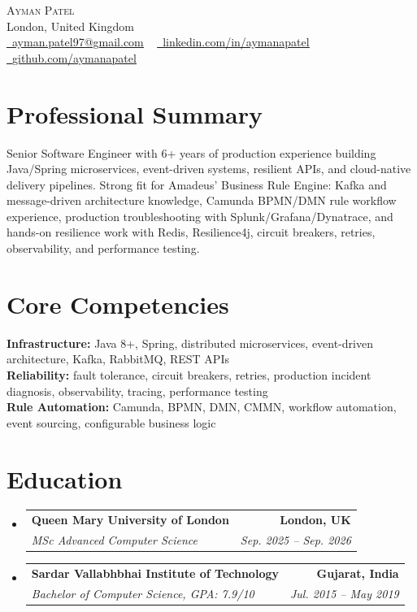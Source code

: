 \documentclass[letterpaper,11pt]{article}
\makeatletter
\newcommand{\resumeSubheading}[4]{
  \vspace{-3pt}\item
    \begin{tabular*}{1.0\textwidth}[t]{l@{\extracolsep{\fill}}r}
      \textbf{#1} & \textbf{\small #2} \\
      \textit{\small#3} & \textit{\small #4} \\
    \end{tabular*}\vspace{-7pt}
}
\newcommand{\resumeSubHeadingListStart}{\begin{itemize}[leftmargin=0.0in, label={}]}
\newcommand{\resumeSubHeadingListEnd}{\end{itemize}}
\makeatother
\begin{document}
    \begin{center}
        {\Huge\scshape Ayman Patel}
        \\ London, United Kingdom\\
        \small
        \href{mailto:ayman.patel97@gmail.com}{\raisebox{-0.2\height}\faEnvelope\  \underline{ayman.patel97@gmail.com}} ~
        \href{https://linkedin.com/in/aymanapatel}{\raisebox{-0.2\height}\faLinkedin\ \underline{linkedin.com/in/aymanapatel}}  ~
        \href{https://github.com/aymanapatel}{\raisebox{-0.2\height}\faGithub\ \underline{github.com/aymanapatel}}
    \end{center}

\section{Professional Summary}
\small{
Senior Software Engineer with 6+ years of production experience building Java/Spring microservices, event-driven systems, resilient APIs, and cloud-native delivery pipelines. Strong fit for Amadeus' Business Rule Engine: Kafka and message-driven architecture knowledge, Camunda BPMN/DMN rule workflow experience, production troubleshooting with Splunk/Grafana/Dynatrace, and hands-on resilience work with Redis, Resilience4j, circuit breakers, retries, observability, and performance testing.
}
\vspace{2pt}

\section{Core Competencies}
\vspace{-7pt}
\begin{itemize}[leftmargin=0.15in, label={}]\small{\item{
\textbf{Infrastructure:} Java 8+, Spring, distributed microservices, event-driven architecture, Kafka, RabbitMQ, REST APIs \\
\textbf{Reliability:} fault tolerance, circuit breakers, retries, production incident diagnosis, observability, tracing, performance testing \\
\textbf{Rule Automation:} Camunda, BPMN, DMN, CMMN, workflow automation, event sourcing, configurable business logic
}}
\end{itemize}

\section{Education}
  \resumeSubHeadingListStart
    \resumeSubheading
      {Queen Mary University of London}{London, UK}
      {MSc Advanced Computer Science}{Sep. 2025 -- Sep. 2026}
    \resumeSubheading
      {Sardar Vallabhbhai Institute of Technology}{Gujarat, India}
      {Bachelor of Computer Science, GPA: 7.9/10}{Jul. 2015 -- May 2019}
  \resumeSubHeadingListEnd
\end{document}
